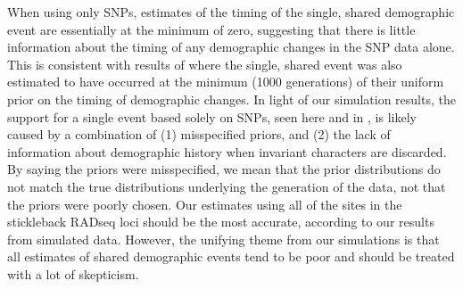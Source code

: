 When using only SNPs, estimates of the timing of the single, shared demographic
event are essentially at the minimum of zero, suggesting that there is little
information about the timing of any demographic changes in the SNP data alone.
This is consistent with results of \citet{Xue2015} where the single, shared
event was also estimated to have occurred at the minimum (1000 generations) of
their uniform prior on the timing of demographic changes.
In light of our simulation results, the support for a single event based solely
on SNPs, seen here and in \citet{Xue2015}, is likely caused by a combination of
(1) misspecified priors, and
(2) the lack of information about demographic history when invariant characters
are discarded.
By saying the priors were misspecified, we mean that the prior distributions do
not match the true distributions underlying the generation of the data, not
that the priors were poorly chosen.
Our estimates using all of the sites in the stickleback RADseq loci should be
the most accurate, according to our results from simulated data.
However, the unifying theme from our simulations is that all estimates of
shared demographic events tend to be poor and should be treated with a lot of
skepticism.
